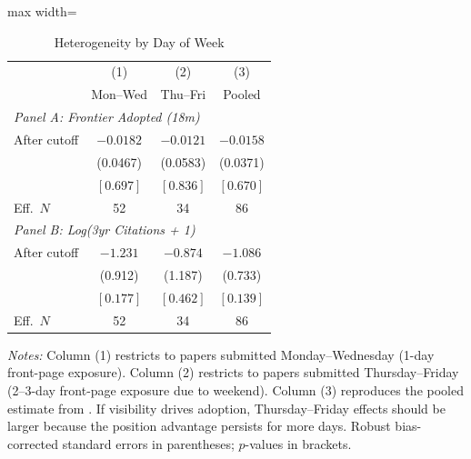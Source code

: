 \begin{table}[htbp]
\centering
\caption{Heterogeneity by Day of Week}
\label{tab:dow}
\begin{adjustbox}{max width=\textwidth}
\begin{tabular}{lccc}
\hline\hline
& (1) & (2) & (3) \\
& Mon--Wed & Thu--Fri & Pooled \\
\hline
\multicolumn{4}{l}{\textit{Panel A: Frontier Adopted (18m)}} \\
After cutoff & $-0.0182$ & $-0.0121$ & $-0.0158$ \\
& (0.0467) & (0.0583) & (0.0371) \\
& $[0.697]$ & $[0.836]$ & $[0.670]$ \\
Eff.\ $N$ & 52 & 34 & 86 \\
\hline
\multicolumn{4}{l}{\textit{Panel B: Log(3yr Citations + 1)}} \\
After cutoff & $-1.231$ & $-0.874$ & $-1.086$ \\
& (0.912) & (1.187) & (0.733) \\
& $[0.177]$ & $[0.462]$ & $[0.139]$ \\
Eff.\ $N$ & 52 & 34 & 86 \\
\hline\hline
\end{tabular}
\end{adjustbox}
\begin{minipage}{0.95\textwidth}
\footnotesize
\textit{Notes:} Column (1) restricts to papers submitted Monday--Wednesday (1-day front-page exposure). Column (2) restricts to papers submitted Thursday--Friday (2--3-day front-page exposure due to weekend). Column (3) reproduces the pooled estimate from . If visibility drives adoption, Thursday--Friday effects should be larger because the position advantage persists for more days. Robust bias-corrected standard errors in parentheses; $p$-values in brackets.
\end{minipage}
\end{table}
